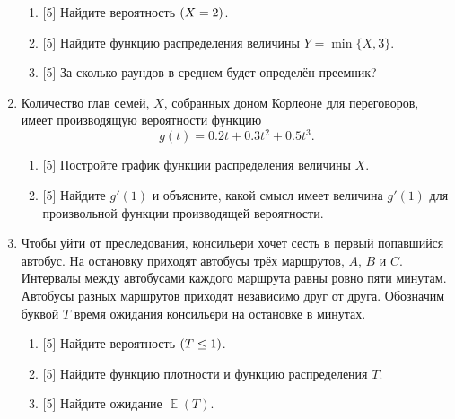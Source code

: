 \documentclass[12pt]{article} %
\DeclareMathOperator{\E}{\mathbb{E}}
\let\P\relax
\DeclareMathOperator{\P}{\mathbb{P}}
\begin{document}
\begin{enumerate}
\begin{enumerate}
    \item {[5]} Найдите вероятность $\P(X = 2)$. 
    \item {[5]} Найдите функцию распределения величины $Y = \min\{X, 3\}$.
    \item {[5]} За сколько раундов в среднем будет определён преемник?
\end{enumerate}

\newpage

\item Количество глав семей, $X$, собранных доном Корлеоне для переговоров, имеет производящую вероятности функцию 
\[
g(t) = 0.2 t + 0.3 t^2 + 0.5 t^3.    
\]
\begin{enumerate}
    \item {[5]} Постройте график функции распределения величины $X$. 
    \item {[5]} Найдите $g'(1)$ и объясните, какой смысл имеет величина $g'(1)$ для произвольной функции производящей вероятности.
\end{enumerate}

\item Чтобы уйти от преследования, консильери хочет сесть в первый попавшийся автобус. 
На остановку приходят автобусы трёх маршрутов, $A$, $B$ и $C$. 
Интервалы между автобусами каждого маршрута равны ровно пяти минутам. 
Автобусы разных маршрутов приходят независимо друг от друга. 
Обозначим буквой $T$ время ожидания консильери на остановке в минутах.

\begin{enumerate}
    \item {[5]} Найдите вероятность $\P(T \leq 1)$.
    \item {[5]} Найдите функцию плотности и функцию распределения $T$.
    \item {[5]} Найдите ожидание $\E(T)$.
\end{enumerate}




\end{enumerate}
\end{document}
